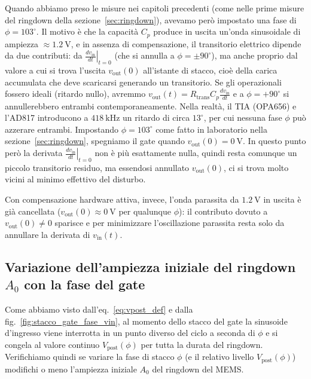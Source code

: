 \documentclass[11pt,a4paper]{article}
\begin{document}
\vspace{0.3cm}
\noindent Quando abbiamo preso le misure nei capitoli precedenti (come nelle prime misure del ringdown della sezione~\ref{sec:ringdown}), avevamo però impostato una fase di $\phi = 103^\circ$. Il motivo è che la capacità $C_p$ produce in uscita un'onda sinusoidale di ampiezza $\approx \SI{1.2}{\volt}$, e in assenza di compensazione, il transitorio elettrico dipende da due contributi: da $\left.\frac{dv_{\text{in}}}{dt}\right|_{t=0}$ (che si annulla a $\phi = \pm 90^\circ$), ma anche proprio dal valore a cui si trova l'uscita $v_{\text{out}}(0)$ all'istante di stacco, cioè della carica accumulata che deve scaricarsi generando un transitorio. Se gli operazionali fossero ideali (ritardo nullo), avremmo $v_{\text{out}}(t) = R_{\text{trans}} C_p \frac{dv_{\text{in}}}{dt}$ e a $\phi = +90^\circ$ si annullerebbero entrambi contemporaneamente. Nella realtà, il TIA (OPA656) e l'AD817 introducono a $\SI{418}{\kilo\hertz}$ un ritardo di circa $13^\circ$, per cui nessuna fase $\phi$ può azzerare entrambi. Impostando $\phi = 103^\circ$ come fatto in laboratorio nella sezione~\ref{sec:ringdown}, spegniamo il gate quando $v_{\text{out}}(0) = \SI{0}{\volt}$. In questo punto però la derivata $\left.\frac{dv_{\text{in}}}{dt}\right|_{t=0}$ non è più esattamente nulla, quindi resta comunque un piccolo transitorio residuo, ma essendosi annullato $v_{\text{out}}(0)$, ci si trova molto vicini al minimo effettivo del disturbo.

\vspace{0.3cm}
\noindent Con compensazione hardware attiva, invece, l'onda parassita da $\SI{1.2}{\volt}$ in uscita è già cancellata ($v_{\text{out}}(0) \approx \SI{0}{\volt}$ per qualunque $\phi$): il contributo dovuto a $v_{\text{out}}(0) \neq 0$ sparisce e per minimizzare l'oscillazione parassita resta solo da annullare la derivata di $v_{\text{in}}(t)$.


\newpage

\subsection{Variazione dell'ampiezza iniziale del ringdown \texorpdfstring{$A_0$}{A0} con la fase del gate}
\label{subsec:teoria_A0_indipendente_fase}

Come abbiamo visto dall'eq.~\eqref{eq:vpost_def} e dalla fig.~\ref{fig:stacco_gate_fase_vin}, al momento dello stacco del gate la sinusoide d'ingresso viene interrotta in un punto diverso del ciclo a seconda di $\phi$ e si congela al valore continuo $V_{\text{post}}(\phi)$ per tutta la durata del ringdown. Verifichiamo quindi se variare la fase di stacco $\phi$ (e il relativo livello $V_{\text{post}}(\phi)$) modifichi o meno l'ampiezza iniziale $A_0$ del ringdown del MEMS.
\end{document}
